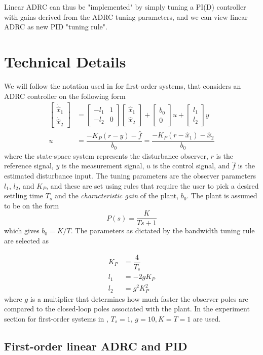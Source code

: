 \documentclass[letterpaper, 10 pt, conference]{ieeeconf}
\newcommand{\bmatrixx}[1]{\begin{bmatrix}#1\end{bmatrix}}
\begin{document}
Linear ADRC can thus be "implemented" by simply tuning a PI(D) controller with gains derived from the ADRC tuning parameters, and we can view linear ADRC as new PID "tuning rule".

\section{Technical Details}
We will follow the notation used in \cite{herbst2013simulative} for first-order systems, that considers an ADRC controller on the following form
\begin{align}
   \bmatrixx{\dot{\hat{x}}_1 \\ \dot{\hat{x}}_2} &= 
   		\bmatrixx{-l_1 & 1 \\ -l_2 & 0} \bmatrixx{\hat{x}_1 \\ \hat{x}_2} + 
		\bmatrixx{b_0 \\ 0} u + \bmatrixx{l_1 \\ l_2} y \\
	u &= \dfrac{-K_P(r-y) - \hat{f}}{b_0} = \dfrac{-K_P(r-\hat{x}_1) - \hat{x}_2}{b_0}
\end{align}
where the state-space system represents the disturbance observer, $r$ is the reference signal, $y$ is the measurement signal, $u$ is the control signal, and $\hat{f}$ is the estimated disturbance input. The tuning parameters are the observer parameters $l_1$, $l_2$, and $K_P$, and these are set using rules that require the user to pick a desired settling time $T_s$ and the \emph{characteristic gain} of the plant, $b_0$. The plant is assumed to be on the form
$$P(s) = \dfrac{K}{Ts+1}$$
which gives $b_0 = K/T$. The parameters as dictated by the bandwidth tuning rule are selected as 


\begin{align}
	K_P &= \dfrac{4}{T_s} \\
	l_1 &= -2gK_P \\
	l_2 &= g^2K_P^2
\end{align}
where $g$ is a multiplier that determines how much faster the observer poles are compared to the closed-loop poles associated with the plant. In the experiment section for first-order systems in \cite{herbst2013simulative}, $T_s = 1$, $g = 10, K = T = 1$ are used.

\subsection{First-order linear ADRC and PID}
\end{document}
